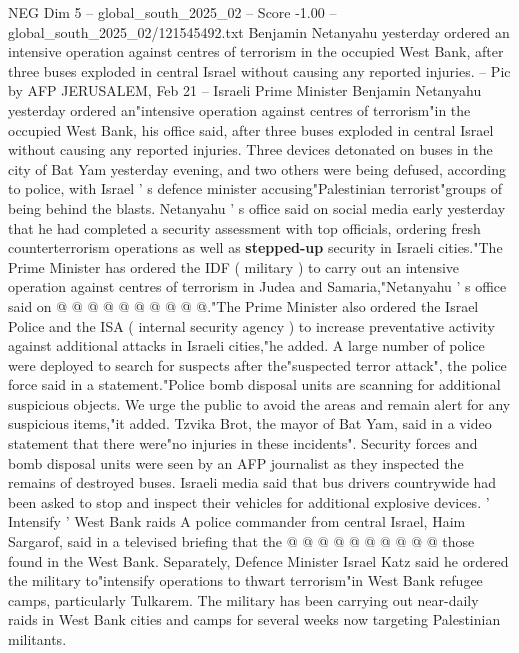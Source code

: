\begin{textsample}{NEG Dim 5 – global\_south\_2025\_02 – Score -1.00 – global\_south\_2025\_02/121545492.txt}  \label{ex:f5_neg_302}
Benjamin Netanyahu yesterday ordered an intensive operation against centres of terrorism in the occupied West Bank, after three buses exploded in central Israel without causing any reported injuries. -- Pic by AFP JERUSALEM, Feb 21 -- Israeli Prime Minister Benjamin Netanyahu yesterday ordered an"intensive operation against centres of terrorism"in the occupied West Bank, his office said, after three buses exploded in central Israel without causing any reported injuries.
Three devices detonated on buses in the city of Bat Yam yesterday evening, and two others were being defused, according to police, with Israel ' s defence minister accusing"Palestinian terrorist"groups of being behind the blasts.
Netanyahu ' s office said on social media early yesterday that he had completed a security assessment with top officials, ordering fresh counterterrorism operations as well as \textbf{stepped-up} security in Israeli cities."The Prime Minister has ordered the IDF ( military ) to carry out an intensive operation against centres of terrorism in Judea and Samaria,"Netanyahu ' s office said on @ @ @ @ @ @ @ @ @ @."The Prime Minister also ordered the Israel Police and the ISA ( internal security agency ) to increase preventative activity against additional attacks in Israeli cities,"he added.
A large number of police were deployed to search for suspects after the"suspected terror attack", the police force said in a statement."Police bomb disposal units are scanning for additional suspicious objects.
We urge the public to avoid the areas and remain alert for any suspicious items,"it added.
Tzvika Brot, the mayor of Bat Yam, said in a video statement that there were"no injuries in these incidents".
Security forces and bomb disposal units were seen by an AFP journalist as they inspected the remains of destroyed buses.
Israeli media said that bus drivers countrywide had been asked to stop and inspect their vehicles for additional explosive devices. ' Intensify ' West Bank raids A police commander from central Israel, Haim Sargarof, said in a televised briefing that the @ @ @ @ @ @ @ @ @ @ those found in the West Bank.
Separately, Defence Minister Israel Katz said he ordered the military to"intensify operations to thwart terrorism"in West Bank refugee camps, particularly Tulkarem.
The military has been carrying out near-daily raids in West Bank cities and camps for several weeks now targeting Palestinian militants.

\end{textsample}
